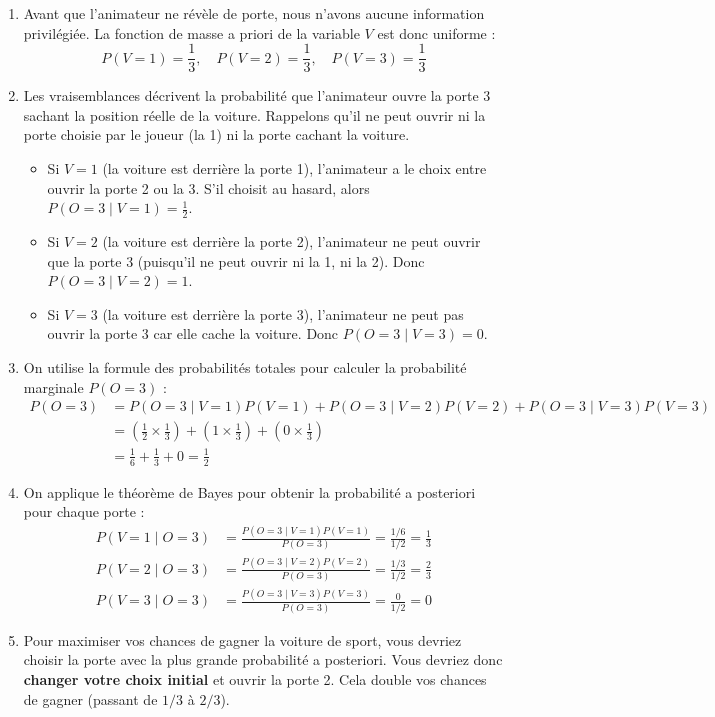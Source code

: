 \documentclass[solutions]{../exercices}
\begin{document}
\begin{solution}
	\begin{enumerate}
		\item Avant que l'animateur ne révèle de porte, nous n'avons aucune information privilégiée. La fonction de masse a priori de la variable $V$ est donc uniforme :
		\[
		P(V=1) = \frac{1}{3}, \quad P(V=2) = \frac{1}{3}, \quad P(V=3) = \frac{1}{3}
		\]

		\item Les vraisemblances décrivent la probabilité que l'animateur ouvre la porte 3 sachant la position réelle de la voiture. Rappelons qu'il ne peut ouvrir ni la porte choisie par le joueur (la 1) ni la porte cachant la voiture.
		\begin{itemize}
			\item Si $V=1$ (la voiture est derrière la porte 1), l'animateur a le choix entre ouvrir la porte 2 ou la 3. S'il choisit au hasard, alors $P(O=3 \mid V=1) = \frac{1}{2}$.
			\item Si $V=2$ (la voiture est derrière la porte 2), l'animateur ne peut ouvrir que la porte 3 (puisqu'il ne peut ouvrir ni la 1, ni la 2). Donc $P(O=3 \mid V=2) = 1$.
			\item Si $V=3$ (la voiture est derrière la porte 3), l'animateur ne peut pas ouvrir la porte 3 car elle cache la voiture. Donc $P(O=3 \mid V=3) = 0$.
		\end{itemize}

		\item On utilise la formule des probabilités totales pour calculer la probabilité marginale $P(O=3)$ :
		\begin{align*}
			P(O=3) &= P(O=3 \mid V=1)P(V=1) + P(O=3 \mid V=2)P(V=2) + P(O=3 \mid V=3)P(V=3) \\
			&= \left(\frac{1}{2} \times \frac{1}{3}\right) + \left(1 \times \frac{1}{3}\right) + \left(0 \times \frac{1}{3}\right) \\
			&= \frac{1}{6} + \frac{1}{3} + 0 = \frac{1}{2}
		\end{align*}

		\item On applique le théorème de Bayes pour obtenir la probabilité a posteriori pour chaque porte :
		\begin{align*}
			P(V=1 \mid O=3) &= \frac{P(O=3 \mid V=1)P(V=1)}{P(O=3)} = \frac{1/6}{1/2} = \frac{1}{3} \\
			P(V=2 \mid O=3) &= \frac{P(O=3 \mid V=2)P(V=2)}{P(O=3)} = \frac{1/3}{1/2} = \frac{2}{3} \\
			P(V=3 \mid O=3) &= \frac{P(O=3 \mid V=3)P(V=3)}{P(O=3)} = \frac{0}{1/2} = 0
		\end{align*}

		\item Pour maximiser vos chances de gagner la voiture de sport, vous devriez choisir la porte avec la plus grande probabilité a posteriori. Vous devriez donc \textbf{changer votre choix initial} et ouvrir la porte 2. Cela double vos chances de gagner (passant de $1/3$ à $2/3$).
	\end{enumerate}
\end{solution}
\end{document}
